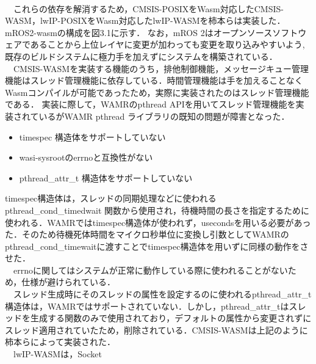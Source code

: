 \\　これらの依存を解消するため，CMSIS-POSIXをWasm対応したCMSIS-WASM，lwIP-POSIXをWasm対応したlwIP-WASMを柿本らは実装した．
mROS2-wasmの構成を図3.1に示す．
なお，mROS 2はオープンソースソフトウェアであることから上位レイヤに変更が加わっても変更を取り込みやすいよう,既存のビルドシステムに極力手を加えずにシステムを構築されている．
\\　CMSIS-WASMを実装する機能のうち，排他制御機能，メッセージキュー管理機能はスレッド管理機能に依存している．時間管理機能は手を加えることなくWasmコンパイルが可能であったため，実際に実装されたのはスレッド管理機能である．
実装に際して，WAMRのpthread APIを用いてスレッド管理機能を実装されているがWAMR pthread ライブラリの既知の問題が障害となった．
\begin{itemize}
    \item timespec 構造体をサポートしていない
    \item wasi-sysrootのerrnoと互換性がない
    \item pthread_attr_t 構造体をサポートしていない
\end{itemize}
timespec構造体は，スレッドの同期処理などに使われるpthread_cond_timedwait 関数から使用され，待機時間の長さを指定するために使われる．WAMRではtimespec構造体が使われず，usecondsを用いる必要があった．そのため待機死体時間をマイクロ秒単位に変換し引数としてWAMRのpthread_cond_timewaitに渡すことでtimespec構造体を用いずに同様の動作をさせた．
\\　errnoに関してはシステムが正常に動作している際に使われることがないため，仕様が避けられている．
\\　スレッド生成時にそのスレッドの属性を設定するのに使われるpthread_attr_t構造体は，WAMRではサポートされていない．しかし，pthread_attr_tはスレッドを生成する関数のみで使用されており，デフォルトの属性から変更されずにスレッド適用されていたため，削除されている．CMSIS-WASMは上記のように柿本らによって実装された．
\\　lwIP-WASMは，Socket